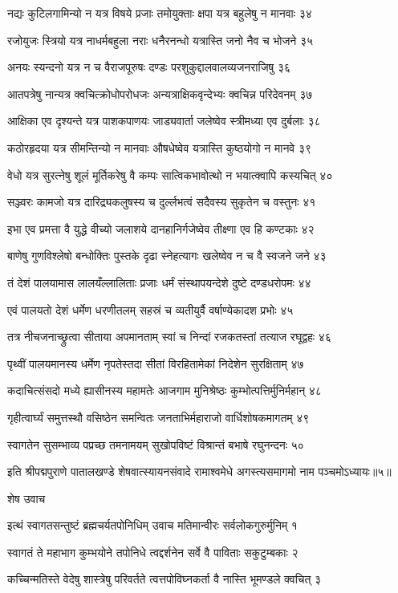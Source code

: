नद्यः कुटिलगामिन्यो न यत्र विषये प्रजाः
तमोयुक्ताः क्षपा यत्र बहुलेषु न मानवाः ३४

रजोयुजः स्त्रियो यत्र नाधर्मबहुला नराः
धनैरनन्धो यत्रास्ति जनो नैव च भोजने ३५

अनयः स्यन्दनो यत्र न च वैराजपूरुषः
दण्डः परशुकुद्दालवालव्यजनराजिषु ३६

आतपत्रेषु नान्यत्र क्वचित्क्रोधोपरोधजः
अन्यत्राक्षिकवृन्देभ्यः क्वचिन्न परिदेवनम् ३७

आक्षिका एव दृश्यन्ते यत्र पाशकपाणयः
जाड्यवार्ता जलेष्वेव स्त्रीमध्या एव दुर्बलाः ३८

कठोरहृदया यत्र सीमन्तिन्यो न मानवाः
औषधेष्वेव यत्रास्ति कुष्ठयोगो न मानवे ३९

वेधो यत्र सुरत्नेषु शूलं मूर्तिकरेषु वै
कम्पः सात्विकभावोत्थो न भयात्क्वापि कस्यचित् ४०

सञ्ज्वरः कामजो यत्र दारिद्र्यकलुषस्य च
दुर्ल्लभत्वं सदैवस्य सुकृतेन च वस्तुनः ४१

इभा एव प्रमत्ता वै युद्धे वीच्यो जलाशये
दानहानिर्गजेष्वेव तीक्ष्णा एव हि कण्टकाः ४२

बाणेषु गुणविश्लेषो बन्धोक्तिः पुस्तके दृढा
स्नेहत्यागः खलेष्वेव न च वै स्वजने जने ४३

तं देशं पालयामास लालयँल्लालिताः प्रजाः
धर्मं संस्थापयन्देशे दुष्टे दण्डधरोपमः ४४

एवं पालयतो देशं धर्मेण धरणीतलम्
सहस्रं च व्यतीयुर्वै वर्षाण्येकादश प्रभोः ४५

तत्र नीचजनाच्छ्रुत्वा सीताया अपमानताम्
स्वां च निन्दां रजकतस्तां तत्याज रघूद्वहः ४६

पृथ्वीं पालयमानस्य धर्मेण नृपतेस्तदा
सीतां विरहितामेकां निदेशेन सुरक्षिताम् ४७

कदाचित्संसदो मध्ये ह्यासीनस्य महामतेः
आजगाम मुनिश्रेष्ठः कुम्भोत्पत्तिर्मुनिर्महान् ४८

गृहीत्वार्घ्यं समुत्तस्थौ वसिष्ठेन समन्वितः
जनताभिर्महाराजो वार्धिशोषकमागतम् ४९

स्वागतेन सुसम्भाव्य पप्रच्छ तमनामयम्
सुखोपविष्टं विश्रान्तं बभाषे रघुनन्दनः ५०

इति श्रीपद्मपुराणे पातालखण्डे शेषवात्स्यायनसंवादे रामाश्वमेधे अगस्त्यसमागमो नाम पञ्चमोऽध्यायः॥५॥


शेष उवाच

इत्थं स्वागतसन्तुष्टं ब्रह्मचर्यतपोनिधिम्
उवाच मतिमान्वीरः सर्वलोकगुरुर्मुनिम् १

स्वागतं ते महाभाग कुम्भयोने तपोनिधे
त्वद्दर्शनेन सर्वे वै पाविताः सकुटुम्बकाः २

कच्चिन्मतिस्ते वेदेषु शास्त्रेषु परिवर्तते
त्वत्तपोविघ्नकर्ता वै नास्ति भूमण्डले क्वचित् ३

